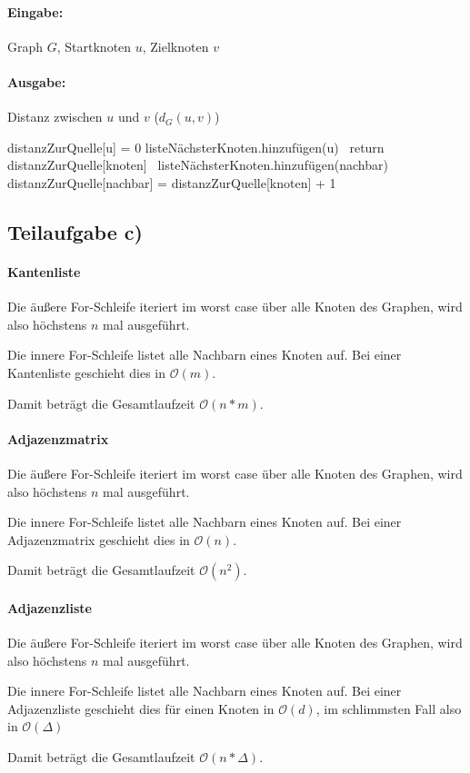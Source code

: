 \documentclass[12pt]{scrartcl}%
\theoremstyle{nonumberplain}
\newcommand{\bO}[1]{\mathcal O(#1)}
\begin{document}
\paragraph{Eingabe:} Graph $G$, Startknoten $u$, Zielknoten $v$

\paragraph{Ausgabe:} Distanz zwischen $u$ und $v$ ($d_G(u,v)$)

\begin{algorithm}
	distanzZurQuelle[u] = 0\;
	listeNächsterKnoten.hinzufügen(u)\;
	 {
		 {\
			return distanzZurQuelle[knoten]\;
		}	
		 {
			\If{distanzZurQuelle[nachbar] == nil]} {\
				listeNächsterKnoten.hinzufügen(nachbar)\;
				distanzZurQuelle[nachbar] = distanzZurQuelle[knoten] + 1\;
			}
		}
	}
\end{algorithm}

\subsection*{Teilaufgabe c)}

\paragraph{Kantenliste}

Die äußere For-Schleife iteriert im worst case über alle Knoten des Graphen, wird also höchstens $n$ mal ausgeführt.

Die innere For-Schleife listet alle Nachbarn eines Knoten auf. Bei einer Kantenliste geschieht dies in $\bO{m}$.

Damit beträgt die Gesamtlaufzeit $\bO{n*m}$.

\paragraph{Adjazenzmatrix}

Die äußere For-Schleife iteriert im worst case über alle Knoten des Graphen, wird also höchstens $n$ mal ausgeführt.

Die innere For-Schleife listet alle Nachbarn eines Knoten auf. Bei einer Adjazenzmatrix geschieht dies in $\bO{n}$.

Damit beträgt die Gesamtlaufzeit $\bO{n^2}$.

\paragraph{Adjazenzliste}

Die äußere For-Schleife iteriert im worst case über alle Knoten des Graphen, wird also höchstens $n$ mal ausgeführt.

Die innere For-Schleife listet alle Nachbarn eines Knoten auf. Bei einer Adjazenzliste geschieht dies für einen Knoten in $\bO{d}$, im schlimmsten Fall also in $\bO{\Delta}$

Damit beträgt die Gesamtlaufzeit $\bO{n*\Delta}$.
\end{document}
